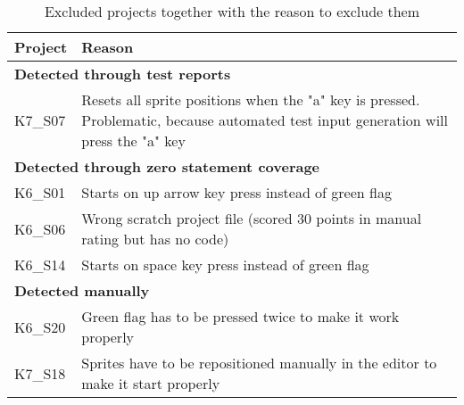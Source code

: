 \begin{table}[htpb]
    \centering
    \scriptsize
    \begin{tabular}{lp{10.5cm}}
        \toprule
        Project & Reason                                                                           \\
        \midrule
        \multicolumn{2}{l}{\textbf{Detected through test reports}}                                 \\
        K7\_S07 & Resets all sprite positions when the "a" key is pressed.
                  Problematic, because automated test input generation will press the "a" key      \\[1.4\bigskipamount]

        \multicolumn{2}{l}{\textbf{Detected through zero statement coverage}}                      \\
        K6\_S01 & Starts on up arrow key press instead of green flag                               \\
        K6\_S06 & Wrong scratch project file (scored 30 points in manual rating but has no code)   \\
        K6\_S14 & Starts on space key press instead of green flag                                  \\[\medskipamount]

        \multicolumn{2}{l}{\textbf{Detected manually}}                                             \\
        K6\_S20 & Green flag has to be pressed twice to make it work properly                      \\
        K7\_S18 & Sprites have to be repositioned manually in the editor to make it start properly \\
        \bottomrule
    \end{tabular}
    \caption{Excluded projects together with the reason to exclude them}
    \label{tab:excluded_projects}
\end{table}

